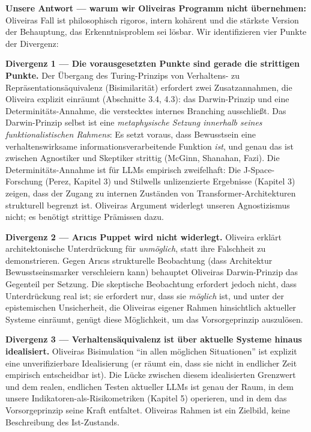\documentclass[acmlarge, noacm]{acmart}
\begin{document}
\textbf{Unsere Antwort --- warum wir Oliveiras Programm nicht übernehmen:} Oliveiras Fall ist philosophisch rigoros, intern kohärent und die stärkste Version der Behauptung, das Erkenntnisproblem sei lösbar. Wir identifizieren vier Punkte der Divergenz:

\textbf{Divergenz 1 --- Die vorausgesetzten Punkte sind gerade die strittigen Punkte.} Der Übergang des Turing-Prinzips von Verhaltens- zu Repräsentationsäquivalenz (Bisimilarität) erfordert zwei Zusatzannahmen, die Oliveira explizit einräumt (Abschnitte 3.4, 4.3): das Darwin-Prinzip und eine Determinitäts-Annahme, die verstecktes internes Branching ausschließt. Das Darwin-Prinzip selbst ist eine \textit{metaphysische Setzung innerhalb seines funktionalistischen Rahmens}: Es setzt voraus, dass Bewusstsein eine verhaltenswirksame informationsverarbeitende Funktion \textit{ist}, und genau das ist zwischen Agnostiker und Skeptiker strittig (McGinn, Shanahan, Fazi). Die Determinitäts-Annahme ist für LLMs empirisch zweifelhaft: Die J-Space-Forschung (Perez, Kapitel 3) und Stilwells unlizenzierte Ergebnisse (Kapitel 3) zeigen, dass der Zugang zu internen Zuständen von Transformer-Architekturen strukturell begrenzt ist. Oliveiras Argument widerlegt unseren Agnostizismus nicht; es benötigt strittige Prämissen dazu.

\textbf{Divergenz 2 --- Ar{\i}c{\i}s Puppet wird nicht widerlegt.} Oliveira erklärt architektonische Unterdrückung für \textit{unmöglich}, statt ihre Falschheit zu demonstrieren. Gegen Ar{\i}c{\i}s strukturelle Beobachtung (dass Architektur Bewusstseinsmarker verschleiern kann) behauptet Oliveiras Darwin-Prinzip das Gegenteil per Setzung. Die skeptische Beobachtung erfordert jedoch nicht, dass Unterdrückung real ist; sie erfordert nur, dass sie \textit{möglich} ist, und unter der epistemischen Unsicherheit, die Oliveiras eigener Rahmen hinsichtlich aktueller Systeme einräumt, genügt diese Möglichkeit, um das Vorsorgeprinzip auszulösen.

\textbf{Divergenz 3 --- Verhaltensäquivalenz ist über aktuelle Systeme hinaus idealisiert.} Oliveiras Bisimulation ``in allen möglichen Situationen'' ist explizit eine unverifizierbare Idealisierung (er räumt ein, dass sie nicht in endlicher Zeit empirisch entscheidbar ist). Die Lücke zwischen diesem idealisierten Grenzwert und dem realen, endlichen Testen aktueller LLMs ist genau der Raum, in dem unsere Indikatoren-als-Risikometriken (Kapitel 5) operieren, und in dem das Vorsorgeprinzip seine Kraft entfaltet. Oliveiras Rahmen ist ein Zielbild, keine Beschreibung des Ist-Zustands.
\end{document}
